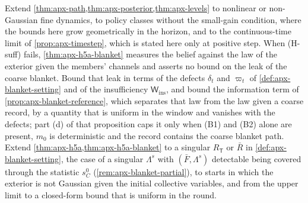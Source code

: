 \begin{openproblem}\label{open:apx-beyond}
Extend \cref{thm:apx-path,thm:apx-posterior,thm:apx-levels} to nonlinear or non-Gaussian fine dynamics, to policy classes without the small-gain condition, where the bounds here grow geometrically in the horizon, and to the continuous-time limit of \cref{prop:apx-timestep}, which is stated here only at positive step. When (H-suff) fails, \cref{thm:apx-h5a-blanket} measures the belief against the law of the exterior given the members' channels and asserts no bound on the leak of the coarse blanket. Bound that leak in terms of the defects $\delta_t$ and $\varpi_t$ of \cref{def:apx-blanket-setting} and of the insufficiency $\mathsf W_{\mathrm{ins}}$, and bound the information term of \cref{prop:apx-blanket-reference}, which separates that law from the law given a coarse record, by a quantity that is uniform in the window and vanishes with the defects; part (d) of that proposition caps it only when (B1) and (B2) alone are present, $m_0$ is deterministic and the record contains the coarse blanket path. Extend \cref{thm:apx-h5a,thm:apx-h5a-blanket} to a singular $R_{\mathsf T}$ or $\bar R$ in \cref{def:apx-blanket-setting}, the case of a singular $\Lambda^s$ with $(\bar F,\Lambda^s)$ detectable being covered through the statistic $s^0_C$ (\cref{rem:apx-blanket-partial}), to starts in which the exterior is not Gaussian given the initial collective variables, and from the upper limit to a closed-form bound that is uniform in the round.
\end{openproblem}
